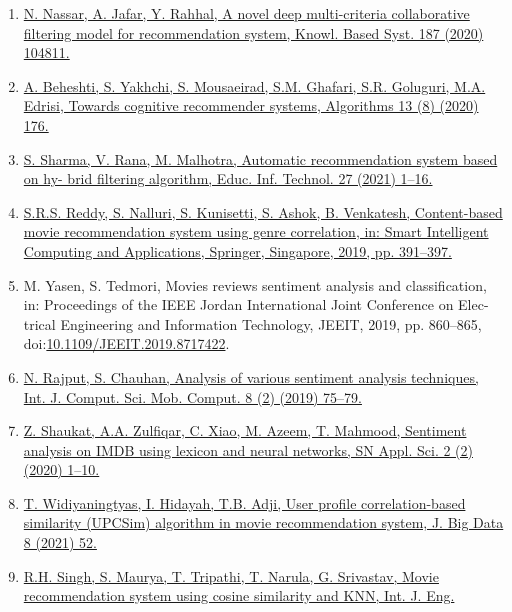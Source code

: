 \documentclass[
]{article}
\begin{document}
\begin{enumerate}
\def\labelenumi{\arabic{enumi}.}
\item
  \href{http://refhub.elsevier.com/S2666-285X(22)00017-6/sbref0001}{N.
  Nassar, A. Jafar, Y. Rahhal, A novel deep multi-criteria collaborative
  ﬁltering model for recommendation system, Knowl. Based Syst. 187
  (2020) 104811.}
\item
  \href{http://refhub.elsevier.com/S2666-285X(22)00017-6/sbref0003}{A.
  Beheshti, S. Yakhchi, S. Mousaeirad, S.M. Ghafari, S.R. Goluguri, M.A.
  Edrisi, Towards cognitive recommender systems, Algorithms 13 (8)
  (2020) 176.}
\item
  \href{http://refhub.elsevier.com/S2666-285X(22)00017-6/sbref0005}{S.
  Sharma, V. Rana, M. Malhotra, Automatic recommendation system based on
  hy- brid ﬁltering algorithm, Educ. Inf. Technol. 27 (2021) 1--16.}
\item
  \href{http://refhub.elsevier.com/S2666-285X(22)00017-6/sbref0007}{S.R.S.
  Reddy, S. Nalluri, S. Kunisetti, S. Ashok, B. Venkatesh, Content-based
  movie recommendation system using genre correlation, in: Smart
  Intelligent Computing and Applications, Springer, Singapore, 2019, pp.
  391--397.}
\item
  M. Yasen, S. Tedmori, Movies reviews sentiment analysis and
  classiﬁcation, in: Proceedings of the IEEE Jordan International Joint
  Conference on Elec- trical Engineering and Information Technology,
  JEEIT, 2019, pp. 860--865,
  doi:\href{https://doi.org/10.1109/JEEIT.2019.8717422}{10.1109/JEEIT.2019.8717422}.
\item
  \href{http://refhub.elsevier.com/S2666-285X(22)00017-6/sbref0011}{N.
  Rajput, S. Chauhan, Analysis of various sentiment analysis techniques,
  Int. J. Comput. Sci. Mob. Comput. 8 (2) (2019) 75--79.}
\item
  \href{http://refhub.elsevier.com/S2666-285X(22)00017-6/sbref0013}{Z.
  Shaukat, A.A. Zulﬁqar, C. Xiao, M. Azeem, T. Mahmood, Sentiment
  analysis on IMDB using lexicon and neural networks, SN Appl. Sci. 2
  (2) (2020) 1--10.}
\item
  \href{http://refhub.elsevier.com/S2666-285X(22)00017-6/sbref0015}{T.
  Widiyaningtyas, I. Hidayah, T.B. Adji, User proﬁle correlation-based
  similarity (UPCSim) algorithm in movie recommendation system, J. Big
  Data 8 (2021) 52.}
\item
  \href{http://refhub.elsevier.com/S2666-285X(22)00017-6/sbref0017}{R.H.
  Singh, S. Maurya, T. Tripathi, T. Narula, G. Srivastav, Movie
  recommendation system using cosine similarity and KNN, Int. J. Eng.
}
\end{enumerate}
\end{document}
